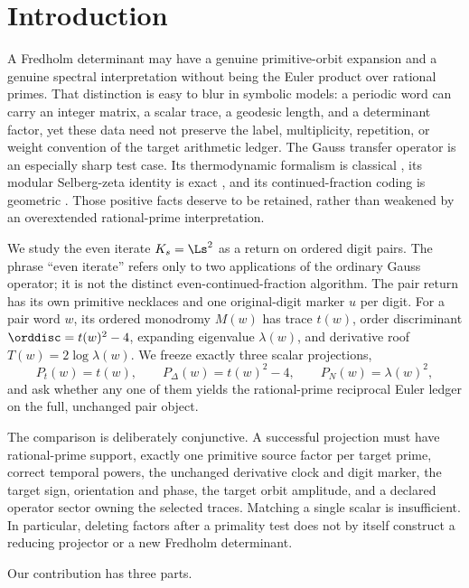 \section{Introduction}
\label{sec:introduction}

A Fredholm determinant may have a genuine primitive-orbit expansion and a
genuine spectral interpretation without being the Euler product over
rational primes.  That distinction is easy to blur in symbolic models: a
periodic word can carry an integer matrix, a scalar trace, a geodesic length,
and a determinant factor, yet these data need not preserve the label,
multiplicity, repetition, or weight convention of the target arithmetic
ledger.  The Gauss transfer operator is an especially sharp test case.  Its
thermodynamic formalism is classical \citep{Mayer1990Gauss}, its modular
Selberg-zeta identity is exact \citep{Mayer1991Selberg,
Mayer1990SelbergPreprint}, and its continued-fraction coding is geometric
\citep{Series1985Modular}.  Those positive facts deserve to be retained,
rather than weakened by an overextended rational-prime interpretation.

We study the even iterate $K_s=\Ls^2$ as a return on ordered digit pairs.
The phrase ``even iterate'' refers only to two applications of the ordinary
Gauss operator; it is not the distinct even-continued-fraction algorithm.
The pair return has its own primitive necklaces and one original-digit marker
$u$ per digit.  For a pair word $w$, its ordered monodromy $M(w)$ has trace
$t(w)$, order discriminant $\orddisc=t(w)^2-4$, expanding eigenvalue
$\lambda(w)$, and derivative roof $T(w)=2\log\lambda(w)$.  We freeze exactly
three scalar projections,
\[
  P_t(w)=t(w),\qquad
  P_\Delta(w)=t(w)^2-4,
  \qquad P_N(w)=\lambda(w)^2,
\]
and ask whether any one of them yields the rational-prime reciprocal Euler
ledger on the full, unchanged pair object.

The comparison is deliberately conjunctive.  A successful projection must
have rational-prime support, exactly one primitive source factor per target
prime, correct temporal powers, the unchanged derivative clock and digit
marker, the target sign, orientation and phase, the target orbit amplitude,
and a declared operator sector owning the selected traces.  Matching a
single scalar is insufficient.  In particular, deleting factors after a
primality test does not by itself construct a reducing projector or a new
Fredholm determinant.

Our contribution has three parts.

